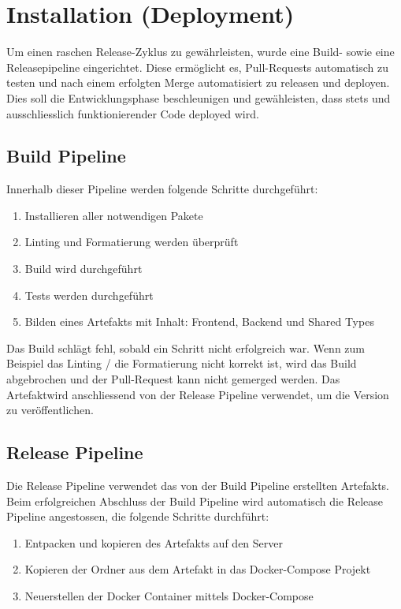 \documentclass[11pt,a4paper]{scrartcl}
\let\oldsection\section
\renewcommand\section{\clearpage\oldsection}
\begin{document}
\section{Installation (Deployment)}

Um einen raschen Release-Zyklus zu gewährleisten, wurde eine Build- sowie eine Releasepipeline eingerichtet.
Diese ermöglicht es, Pull-Requests automatisch zu testen und nach einem erfolgten Merge automatisiert zu releasen und deployen.
Dies soll die Entwicklungsphase beschleunigen und gewähleisten, dass stets und ausschliesslich funktionierender Code deployed wird.

\subsection{Build Pipeline}
Innerhalb dieser Pipeline werden folgende Schritte durchgeführt:
\begin{enumerate}
  \item Installieren aller notwendigen Pakete
  \item Linting und Formatierung werden überprüft
  \item Build wird durchgeführt
  \item Tests werden durchgeführt
  \item Bilden eines Artefakts mit Inhalt: Frontend, Backend und Shared Types
\end{enumerate}
Das Build schlägt fehl, sobald ein Schritt nicht erfolgreich war. Wenn zum Beispiel das Linting / die Formatierung nicht korrekt ist, wird das Build abgebrochen und der Pull-Request kann nicht gemerged werden. Das Artefaktwird anschliessend von der Release Pipeline verwendet, um die Version zu veröffentlichen.

\subsection{Release Pipeline}
Die Release Pipeline verwendet das von der Build Pipeline erstellten Artefakts. Beim erfolgreichen Abschluss der Build Pipeline wird automatisch die Release Pipeline angestossen, die folgende Schritte durchführt:
\begin{enumerate}
  \item Entpacken und kopieren des Artefakts auf den Server
  \item Kopieren der Ordner aus dem Artefakt in das Docker-Compose Projekt
  \item Neuerstellen der Docker Container mittels Docker-Compose
\end{enumerate}
\end{document}
